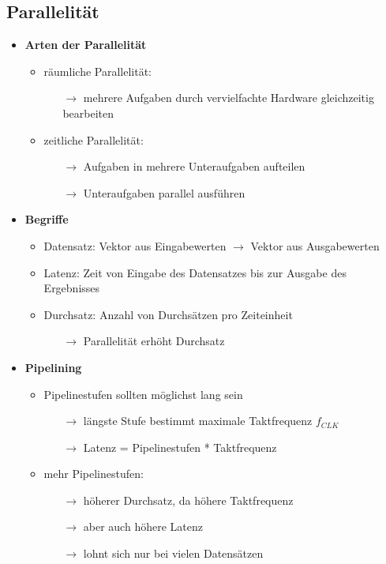 \subsection{Parallelität}
\begin{itemize}

\item \textbf{Arten der Parallelität}
	\begin{itemize}
	\item räumliche Parallelität:
		\begin{itemize}
		\item[$\rightarrow$] mehrere Aufgaben durch vervielfachte Hardware gleichzeitig bearbeiten
		\end{itemize}
	
	\item zeitliche Parallelität:
		\begin{itemize}
		\item[$\rightarrow$] Aufgaben in mehrere Unteraufgaben aufteilen
		\item[$\rightarrow$] Unteraufgaben parallel ausführen
		\end{itemize}
	
	\end{itemize}
	
\item \textbf{Begriffe}
	\begin{itemize}
	\item Datensatz: Vektor aus Eingabewerten $\rightarrow$ Vektor aus Ausgabewerten
	\item Latenz: Zeit von Eingabe des Datensatzes bis zur Ausgabe des Ergebnisses
	\item Durchsatz: Anzahl von Durchsätzen pro Zeiteinheit
		\begin{itemize}
		\item[$\rightarrow$] Parallelität erhöht Durchsatz
		\end{itemize}
	
	\end{itemize}
	
\item \textbf{Pipelining}
	\begin{itemize}
	\item Pipelinestufen sollten möglichst lang sein
		\begin{itemize}
		\item[$\rightarrow$] längste Stufe bestimmt maximale Taktfrequenz $f_{CLK}$
		\item[$\rightarrow$] Latenz = Pipelinestufen * Taktfrequenz
		\end{itemize}			
	\item mehr Pipelinestufen:
		\begin{itemize}
		\item[$\rightarrow$] höherer Durchsatz, da höhere Taktfrequenz
		\item[$\rightarrow$] aber auch höhere Latenz
		\item[$\rightarrow$] lohnt sich nur bei vielen Datensätzen
		\end{itemize}
		
	\end{itemize}

\end{itemize}

